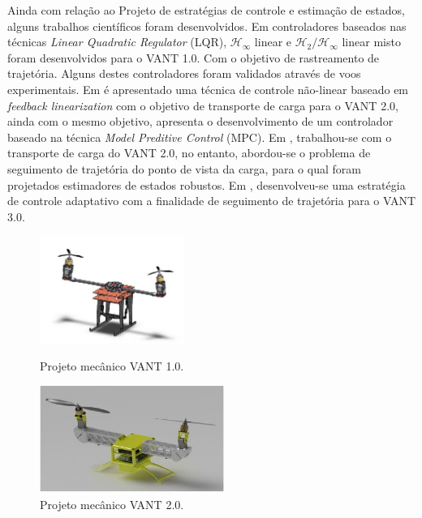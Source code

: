 Ainda com relação ao Projeto de estratégias de controle e estimação de estados, alguns trabalhos científicos foram desenvolvidos. Em \cite{Donadel2015} controladores baseados nas técnicas \textit{Linear Quadratic Regulator} (LQR), $\mathcal{H}_\infty$ linear e $\mathcal{H}_2/\mathcal{H}_\infty$ linear misto foram desenvolvidos para o VANT 1.0. Com o objetivo de rastreamento de trajetória. Alguns destes controladores foram validados através de voos experimentais. Em \cite{Marcelinol2014} é apresentado uma técnica de controle não-linear baseado em \textit{feedback linearization} com o objetivo de transporte de carga para o VANT 2.0, ainda com o mesmo objetivo, \cite{Richard2016} apresenta o desenvolvimento de um controlador baseado na técnica \textit{Model Preditive Control} (MPC). Em \cite{Brenner2016}, trabalhou-se com o transporte de carga do VANT 2.0, no entanto, abordou-se o problema de seguimento de trajetória do ponto de vista da carga, para o qual foram projetados estimadores de estados robustos. Em \cite{Daniel2016}, desenvolveu-se uma estratégia de controle adaptativo com a finalidade de seguimento de trajetória para o VANT 3.0. 
		
\begin{figure} [H]
		\centering
		\begin{minipage}{.5\textwidth}
			\centering
			\includegraphics[height=3.5cm]{figuras/VANT1}
			\caption{Projeto mecânico VANT 1.0.}
			\label{vant1}
		\end{minipage}%
		\begin{minipage}{.5\textwidth}
			\centering
			\includegraphics[height=3.5cm]{figuras/VANT2}
			\caption{Projeto mecânico VANT 2.0.}
			\label{vant2}
			\end{minipage}
	\end{figure}
					

